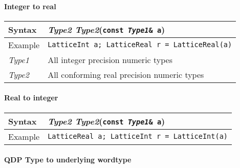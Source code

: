 \documentclass[12pt,letterpaper]{article}
\newcommand{\tLatticeReal}{LatticeReal}
\newcommand{\tLatticeInt}{LatticeInt}
\begin{document}
\paragraph{Integer to real}

\begin{flushleft}
  \begin{tabular}{|l|l|}
  \hline
  Syntax      & {\it Type2 Type2}({\tt const {\it Type1}\& a})\\
  \hline
  Example     & {\tt \tLatticeInt{} a; \tLatticeReal{} r = \tLatticeReal(a)} \\
  \hline
  {\it Type1} & All integer precision numeric types \\
  {\it Type2} & All conforming real precision numeric types \\
  \hline
  \end{tabular}
\end{flushleft}

\paragraph{Real to integer}

\begin{flushleft}
  \begin{tabular}{|l|l|}
  \hline
  Syntax      & {\it Type2 Type2}({\tt const {\it Type1}\& a})\\
  \hline
  Example     & {\tt \tLatticeReal{} a; \tLatticeInt{} r = \tLatticeInt(a)} \\
  \hline
  \end{tabular}
\end{flushleft}

\paragraph{QDP Type to underlying wordtype} 
\end{document}

